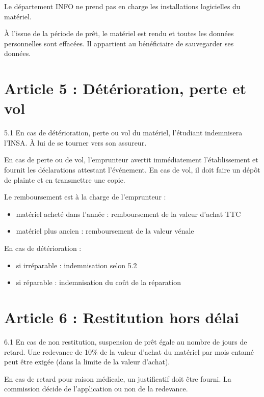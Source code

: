 \documentclass[12pt,a4paper]{article}
\begin{document}
 Le département INFO ne prend pas en charge les installations logicielles du matériel.

 À l’issue de la période de prêt, le matériel est rendu et toutes les données personnelles sont effacées.  
Il appartient au bénéficiaire de sauvegarder ses données.

\section*{Article 5 : Détérioration, perte et vol}

5.1 En cas de détérioration, perte ou vol du matériel, l’étudiant indemnisera l’INSA. À lui de se tourner vers son assureur.

 En cas de perte ou de vol, l’emprunteur avertit immédiatement l’établissement et fournit les déclarations attestant l’événement.  
En cas de vol, il doit faire un dépôt de plainte et en transmettre une copie.  

Le remboursement est à la charge de l’emprunteur :
\begin{itemize}
    \item matériel acheté dans l’année : remboursement de la valeur d’achat TTC
    \item matériel plus ancien : remboursement de la valeur vénale
\end{itemize}

 En cas de détérioration :
\begin{itemize}
    \item si irréparable : indemnisation selon 5.2
    \item si réparable : indemnisation du coût de la réparation
\end{itemize}

\section*{Article 6 : Restitution hors délai}

6.1 En cas de non restitution, suspension de prêt égale au nombre de jours de retard.  
Une redevance de 10\% de la valeur d’achat du matériel par mois entamé peut être exigée (dans la limite de la valeur d’achat).

 En cas de retard pour raison médicale, un justificatif doit être fourni. La commission décide de l’application ou non de la redevance.
\end{document}
